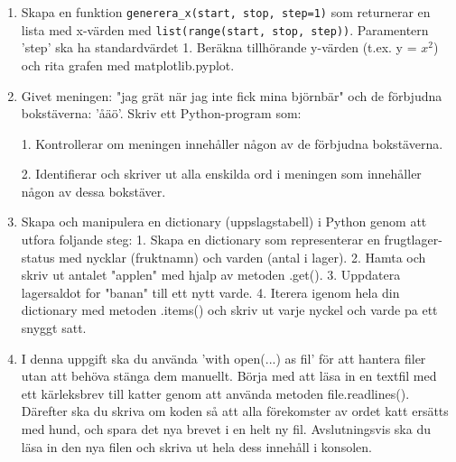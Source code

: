 \documentclass[11pt,a4paper]{article}
\begin{document}
\begin{enumerate}
    14. Räkna och skriv ut hur många förekomster av "katt" som finns i listan.
    
    15. Vänd på listan baklänges direkt på plats med metoden '.reverse()' och skriv ut den.
    
    16. Lägg till strängen "hund" längst bak i listan med metoden '.insert()'.


    Här är koden du behöver:
    \begin{lstlisting}
        # Förberedelsekod: Skapar startlistan med tillräckligt med element
    data = [
        "apa",
        "björn",
        "joker",
        "katt",
        7,
        "joker",
        "elefant",
        "katt",
        "fisk",
        "gepardt",
        "häst",
        "joker",
        10,
    ]

    print("Ursprunglig lista:", data)
    print("-" * 50)
    \end{lstlisting}

    \item Skapa en funktion \texttt{generera\_x(start, stop, step=1)} som returnerar en lista med x-värden med \texttt{list(range(start, stop, step))}. Paramentern 'step' ska ha standardvärdet 1. Beräkna tillhörande y-värden (t.ex. y = $x^2$) och rita grafen med matplotlib.pyplot.
    \item Givet meningen: "jag grät när jag inte fick mina björnbär" och de förbjudna bokstäverna: 'åäö'. Skriv ett Python-program som:
            
        1. Kontrollerar om meningen innehåller någon av de förbjudna bokstäverna.
        
        2. Identifierar och skriver ut alla enskilda ord i meningen som innehåller någon av dessa bokstäver.
    \item Skapa och manipulera en dictionary (uppslagstabell) i Python genom att utfora foljande steg:
        1. Skapa en dictionary som representerar en frugtlager-status med nycklar (fruktnamn) och varden (antal i lager).
        2. Hamta och skriv ut antalet "applen" med hjalp av metoden .get().
        3. Uppdatera lagersaldot for "banan" till ett nytt varde.
        4. Iterera igenom hela din dictionary med metoden .items() och skriv ut varje nyckel och varde pa ett snyggt satt.
    \item I denna uppgift ska du använda 'with open(...) as fil' för att hantera filer utan att behöva stänga dem manuellt. Börja med att läsa in en textfil med ett kärleksbrev till katter genom att använda metoden file.readlines(). Därefter ska du skriva om koden så att alla förekomster av ordet katt ersätts med hund, och spara det nya brevet i en helt ny fil. Avslutningsvis ska du läsa in den nya filen och skriva ut hela dess innehåll i konsolen.
    

\end{enumerate}
\end{document}
